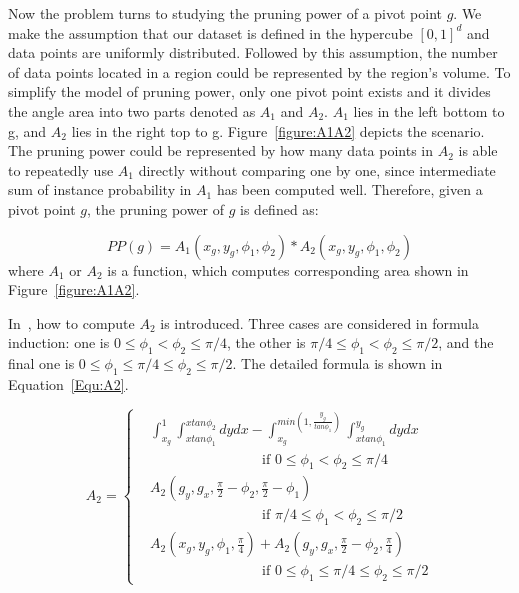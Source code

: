 Now the problem turns to studying the pruning power of a pivot point $g$. We make the assumption that our dataset is defined in the hypercube $[0,1]^d$ and data points are uniformly distributed. Followed by this assumption, the number of data points located in a region could be represented by the region's volume. To simplify the model of pruning power, only one pivot point exists and it divides the angle area into two parts denoted as $A_1$ and $A_2$. $A_1$ lies in the left bottom to g, and $A_2$ lies in the right top to g. Figure~\ref{figure:A1A2} depicts the scenario. The pruning power could be represented by how many data points in $A_2$ is able to repeatedly use $A_1$ directly without comparing one by one, since intermediate sum of instance probability in $A_1$ has been computed well. Therefore, given a pivot point $g$, the pruning power of $g$ is defined as:

\begin{equation}
PP(g) = A_1(x_g, y_g, \phi_1, \phi_2) * A_2(x_g, y_g, \phi_1, \phi_2)
\end{equation}
where $A_1$ or $A_2$ is a function, which computes corresponding area shown in Figure~\ref{figure:A1A2}.

In~\cite{ref:AngularPartition}, how to compute $A_2$ is introduced. Three cases are considered in formula induction: one is $0 \leq \phi_1 < \phi_2 \leq \pi/4$, the other is $\pi/4 \leq \phi_1 < \phi_2 \leq \pi/2$, and the final one is $0 \leq \phi_1 \leq \pi/4 \le \phi_2 \leq \pi/2$. The detailed formula is shown in Equation~\ref{Equ:A2}.

\begin{equation}
\label{Equ:A2}
A_2 = 
\begin{cases}
& \int_{x_g}^{1} \int_{x tan \phi_1}^{x tan \phi_2} dydx- \int_{x_g}^{min(1, \frac{y_g}{tan \phi_1})} \int_{x tan \phi_1}^{y_g} dydx  \\
& \qquad \qquad \qquad \qquad \mbox{if } 0 \leq \phi_1 < \phi_2 \leq \pi/4 \\ 
& A_2(g_y, g_x, \frac{\pi}{2} - \phi_2, \frac{\pi}{2} - \phi_1)\\
& \qquad \qquad \qquad \qquad \mbox{if } \pi/4 \leq \phi_1 < \phi_2 \leq \pi/2 \\
& A_2(x_g, y_g, \phi_1, \frac{\pi}{4}) + A_2(g_y, g_x, \frac{\pi}{2} - \phi_2, \frac{\pi}{4}) \\
& \qquad \qquad \qquad \qquad \mbox{if } 0 \leq \phi_1 \leq \pi/4 \le \phi_2 \leq \pi/2
\end{cases}
\end{equation}

